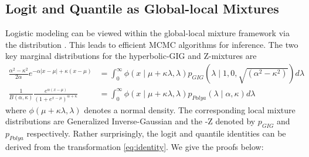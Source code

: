 \documentclass[lineno]{biometrika}
\begin{document}
\subsection{Logit and Quantile as Global-local Mixtures}
Logistic modeling can be viewed within the global-local mixture framework via the \PG distribution \citep{polson2013bayesian}. This leads to efficient MCMC algorithms for inference. The two key marginal distributions for the hyperbolic-GIG \citep{barndorff1977infinite} and Z-\Polya mixtures \citep{polson2013bayesian,barndorff1982normal} are 
\begin{align}
\frac{\alpha^2-\kappa^2}{2\alpha} e^{-\alpha|x-\mu| + \kappa(x-\mu)} & = \int_0^{\infty} \phi(x \mid \mu + \kappa \lambda, \lambda) p_{GIG}(\lambda \mid 1,0,\sqrt{(\alpha^2-\kappa^2)}) d\lambda \label{eq:GIG}\\
\frac{1}{B(\alpha,\kappa)} \frac{e^{\alpha(x-\mu)}}{(1+e^{x-\mu})^{\alpha + \kappa}} & = \int_0^{\infty} \phi( x \mid \mu + \kappa \lambda, \lambda) p_{Polya}(\lambda \mid \alpha,\kappa)  d\lambda \label{eq:polya}
\end{align}
where $\phi(\mu + \kappa \lambda, \lambda)$ denotes a normal density. The corresponding local mixture distributions are Generalized Inverse-Gaussian and the \Polya-Z denoted by $p_{GIG}$ and $p_{Polya}$ respectively. Rather surprisingly, the logit and quantile identities can be derived from the \CS transformation \eqref{eq:identity}. We give the proofs below: 
\end{document}
